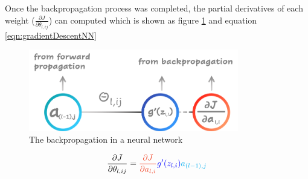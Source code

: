 \begin{itemize}
    Once the backpropagation process was completed, the partial derivatives of each weight ($\frac{\partial J}{\partial \theta_{l,ij}}$) 
    can computed which is shown as figure \ref{fig:gradientDescentNN} and equation \ref{eqn:gradientDescentNN}
    
    \begin{figure}[H] \label{fig:gradientDescentNN}
        \centering
        \includegraphics[width=3.6in]{./images/gradient_descent_neural_network.png}
        \caption{The backpropagation in a neural network}
    \end{figure}
    
    \begin{equation} \label{eqn:gradientDescentNN}
        \frac{\partial J}{\partial \theta_{l,ij}} = \color{RedOrange} \frac{\partial J}{\partial a_{l,i}} \color{blue} g'(z_{l,i}) \color{cyan} a_{(l-1),j} \color{black}
    \end{equation}
\end{itemize}
    
    
